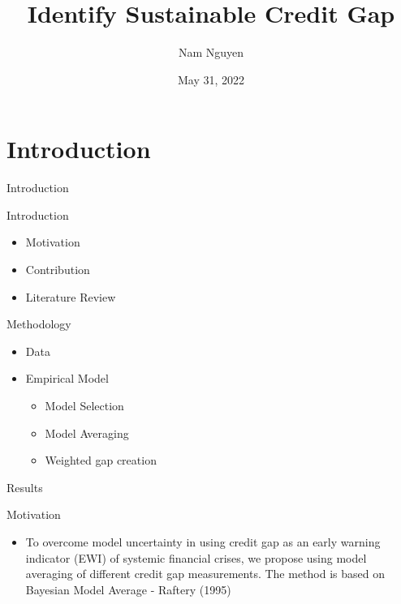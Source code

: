\documentclass[
  ignorenonframetext,
]{beamer}
\title{Identify Sustainable Credit Gap}
\author{Nam Nguyen}
\date{May 31, 2022}
\institute{UWM}
\providecommand{\tightlist}{%
  \setlength{\itemsep}{0pt}\setlength{\parskip}{0pt}}
\begin{document}
\frame{\titlepage}

\hypertarget{introduction}{%
\section{Introduction}\label{introduction}}

\begin{frame}{Introduction}
\begin{block}{Introduction}
\protect\hypertarget{introduction-1}{}
\begin{itemize}
\tightlist
\item
  Motivation
\item
  Contribution
\item
  Literature Review
\end{itemize}
\end{block}

\begin{block}{Methodology}
\protect\hypertarget{methodology}{}
\begin{itemize}
\tightlist
\item
  Data
\item
  Empirical Model

  \begin{itemize}
  \tightlist
  \item
    Model Selection
  \item
    Model Averaging
  \item
    Weighted gap creation
  \end{itemize}
\end{itemize}
\end{block}

\begin{block}{Results}
\protect\hypertarget{results}{}
\end{block}
\end{frame}

\begin{frame}{Motivation}
\protect\hypertarget{motivation}{}
\begin{itemize}
\tightlist
\item
  To overcome model uncertainty in using credit gap as an early warning
  indicator (EWI) of systemic financial crises, we propose using model
  averaging of different credit gap measurements. The method is based on
  Bayesian Model Average - Raftery (1995)
\end{itemize}
\end{frame}
\end{document}
